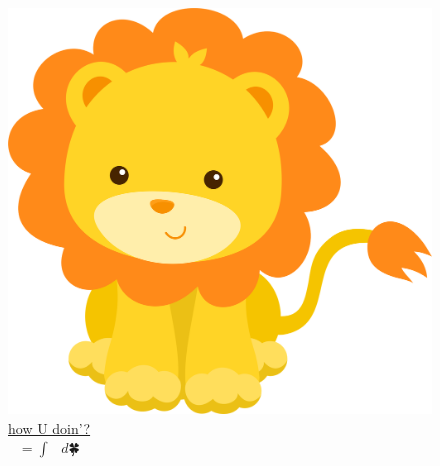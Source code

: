 \documentclass[a4paper,english]{article}
\begin{document}
	\thispagestyle{empty}
	\begin{figure}
		\centering
		\includegraphics[width=0.81\paperwidth]{img/lion.png}
		\caption*{\href{https://github.com/How-u-doing}{how U doin'?}
			\\ $🐳^{🐳^{🐳}} = ∫_{🎃}^{🎅} 🐑 \ d🍀$ }
		\label{cover:lion}
	\end{figure}
	\pagecolor{pink}
	
\end{document}
